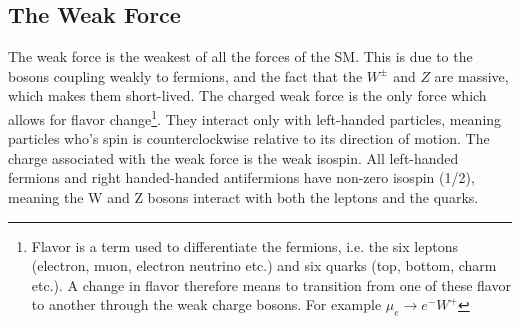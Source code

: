 \subsection{The Weak Force}
The weak force is the weakest of all the forces of the \ac{SM}. This is due to the bosons 
coupling weakly to fermions, and the fact that the $W^{\pm}$ and $Z$ are massive, which makes them short-lived. 
The charged weak force is the only force which allows for flavor change\footnote{Flavor is a term used to differentiate the 
fermions, i.e. the six leptons (electron, muon, electron neutrino etc.) and six quarks (top, bottom, charm etc.).
A change in flavor therefore means to transition from one of these flavor to another through the weak 
charge bosons. For example $\mu_e \rightarrow e^{-}W^+$ }. They interact only with left-handed particles, meaning particles 
who's spin is counterclockwise relative to its direction of motion. The charge associated with the weak force is the weak isospin. 
All left-handed fermions and right handed-handed antifermions have non-zero isospin (1/2), meaning the W and Z bosons interact with 
both the leptons and the quarks.  